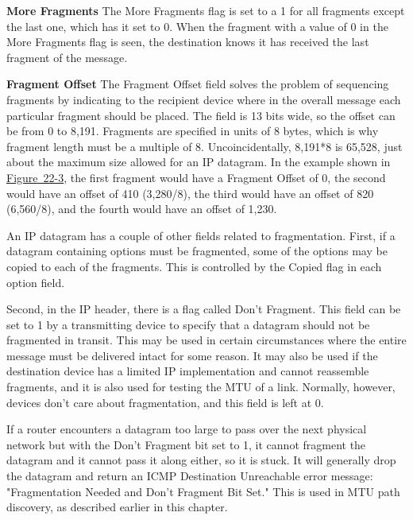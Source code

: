 \documentclass[b5paper,11pt]{memoir}
\begin{document}
{\textbf{\protect\hypertarget{ch22s02.htmlux5cux23idx-CHP-22-0811}{}{}More
Fragments}} The More Fragments flag is set to a 1 for all fragments
except the last one, which has it set to 0. When the fragment with a
value of 0 in the More Fragments flag is seen, the destination knows it
has received the last fragment of the message.

{\textbf{Fragment Offset}} The Fragment Offset field solves the problem
of sequencing fragments by indicating to the recipient device where in
the overall message each particular fragment should be placed. The field
is 13 bits wide, so the offset can be from 0 to 8,191. Fragments are
specified in units of 8 bytes, which is why fragment length must be a
multiple of 8. Uncoincidentally, 8,191*8 is 65,528, just about the
maximum size allowed for an IP datagram. In the example shown in
\protect\hyperlink{ch22s02.htmlux5cux23ipv4_datagram_fragmentation_process_in_t}{Figure~22-3},
the first fragment would have a Fragment Offset of 0, the second would
have an offset of 410 (3,280/8), the third would have an offset of 820
(6,560/8), and the fourth would have an offset of 1,230.

An IP datagram has a couple of other fields related to fragmentation.
First, if a datagram containing options must be fragmented, some of the
options may be copied to each of the fragments. This is controlled by
the \protect\hypertarget{ch22s02.htmlux5cux23idx-CHP-22-0812}{}{}Copied
flag in each option field.

Second, in the IP header, there is a flag called
\protect\hypertarget{ch22s02.htmlux5cux23idx-CHP-22-0813}{}{}Don't
Fragment. This field can be set to 1 by a transmitting device to specify
that a datagram should not be fragmented in transit. This may be used in
certain circumstances where the entire message must be delivered intact
for some reason. It may also be used if the destination device has a
limited IP implementation and cannot reassemble fragments, and it is
also used for testing the MTU of a link. Normally, however, devices
don't care about fragmentation, and this field is left at 0.

If a router encounters a datagram too large to pass over the next
physical network but with the Don't Fragment bit set to 1, it cannot
fragment the datagram and it cannot pass it along either, so it is
stuck. It will generally drop the datagram and return an ICMP
Destination Unreachable error message: "Fragmentation Needed and Don't
Fragment Bit Set." This is used in MTU path discovery, as described
earlier in this chapter.
\end{document}
